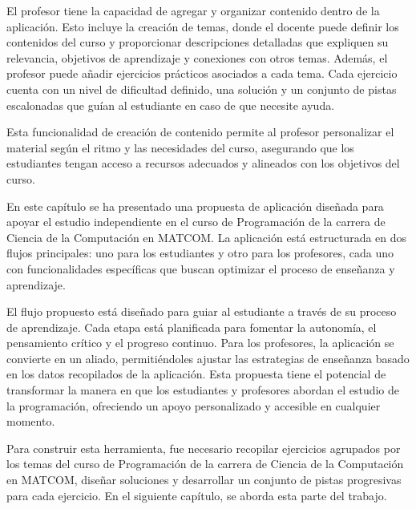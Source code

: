 \documentclass{article}
\begin{document}
El profesor tiene la capacidad de agregar y organizar contenido dentro de la aplicación. Esto incluye la creación de temas, donde el docente puede definir los contenidos del curso y proporcionar descripciones detalladas que expliquen su relevancia, objetivos de aprendizaje y conexiones con otros temas. Además, el profesor puede añadir ejercicios prácticos asociados a cada tema. Cada ejercicio cuenta con un nivel de dificultad definido, una solución y un conjunto de pistas escalonadas que guían al estudiante en caso de que necesite ayuda.

Esta funcionalidad de creación de contenido permite al profesor personalizar el material según el ritmo y las necesidades del curso, asegurando que los estudiantes tengan acceso a recursos adecuados y alineados con los objetivos del curso.

En este capítulo se ha presentado una propuesta de aplicación diseñada para apoyar el estudio independiente en el curso de Programación de la carrera de Ciencia de la Computación en \mbox{MATCOM}. La aplicación está estructurada en dos flujos principales: uno para los estudiantes y otro para los profesores, cada uno con funcionalidades específicas que buscan optimizar el proceso de enseñanza y aprendizaje.

El flujo propuesto está diseñado para guiar al estudiante a través de su proceso de aprendizaje. Cada etapa está planificada para fomentar la autonomía, el pensamiento crítico y el progreso continuo. Para los profesores, la aplicación se convierte en un aliado, permitiéndoles ajustar las estrategias de enseñanza basado en los datos recopilados de la aplicación. Esta propuesta tiene el potencial de transformar la manera en que los estudiantes y profesores abordan el estudio de la programación, ofreciendo un apoyo personalizado y accesible en cualquier momento.

Para construir esta herramienta, fue necesario recopilar ejercicios agrupados por los temas del curso de Programación de la carrera de Ciencia de la Computación en \mbox{MATCOM}, diseñar soluciones y desarrollar un conjunto de pistas progresivas para cada ejercicio. En el siguiente capítulo, se aborda esta parte del trabajo.
\end{document}
